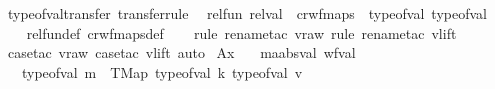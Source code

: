 \begin{isabellebody}
\isanewline
\isanewline
{}\isamarkupfalse%
\ type{\isacharunderscore}{\kern0pt}of{\isacharunderscore}{\kern0pt}val{\isacharunderscore}{\kern0pt}transfer\ {\isacharbrackleft}{\kern0pt}transfer{\isacharunderscore}{\kern0pt}rule{\isacharbrackright}{\kern0pt}{\isacharcolon}{\kern0pt}\isanewline
\ \ {\isachardoublequoteopen}rel{\isacharunderscore}{\kern0pt}fun\ {\isacharparenleft}{\kern0pt}rel{\isacharunderscore}{\kern0pt}val\ {\isacharparenleft}{\kern0pt}{\isacharequal}{\kern0pt}{\isacharparenright}{\kern0pt}\ cr{\isacharunderscore}{\kern0pt}wf{\isacharunderscore}{\kern0pt}maps{\isacharparenright}{\kern0pt}\ {\isacharparenleft}{\kern0pt}{\isacharequal}{\kern0pt}{\isacharparenright}{\kern0pt}\ type{\isacharunderscore}{\kern0pt}of{\isacharunderscore}{\kern0pt}val\ type{\isacharunderscore}{\kern0pt}of{\isacharunderscore}{\kern0pt}val{\isachardoublequoteclose}\isanewline
%
\isadelimproof
\ \ %
\endisadelimproof
%
\isatagproof
{}\isamarkupfalse%
\ rel{\isacharunderscore}{\kern0pt}fun{\isacharunderscore}{\kern0pt}def\ cr{\isacharunderscore}{\kern0pt}wf{\isacharunderscore}{\kern0pt}maps{\isacharunderscore}{\kern0pt}def\isanewline
\ \ \isamarkupfalse%
\ {\isacharparenleft}{\kern0pt}rule{\isacharcomma}{\kern0pt}\ rename{\isacharunderscore}{\kern0pt}tac\ v{\isacharunderscore}{\kern0pt}raw{\isacharcomma}{\kern0pt}\ rule{\isacharcomma}{\kern0pt}\ rename{\isacharunderscore}{\kern0pt}tac\ v{\isacharunderscore}{\kern0pt}lift{\isacharparenright}{\kern0pt}\isanewline
\ \ \isamarkupfalse%
\ {\isacharparenleft}{\kern0pt}case{\isacharunderscore}{\kern0pt}tac\ v{\isacharunderscore}{\kern0pt}raw{\isacharsemicolon}{\kern0pt}\ case{\isacharunderscore}{\kern0pt}tac\ v{\isacharunderscore}{\kern0pt}lift{\isacharsemicolon}{\kern0pt}\ auto{\isacharparenright}{\kern0pt}%
\endisatagproof
{\isafoldproof}%
%
\isadelimproof
\isanewline
%
\endisadelimproof
\isanewline
\isanewline
\isanewline
\isanewline
{}\isamarkupfalse%
\ Ax{}{\isacharcolon}{\kern0pt}\isanewline
\ \ \ m{\isacharcolon}{\kern0pt}{\isacharcolon}{\kern0pt}{\isachardoublequoteopen}{\isacharprime}{\kern0pt}a{\isacharcolon}{\kern0pt}{\isacharcolon}{\kern0pt}absval\ wf{\isacharunderscore}{\kern0pt}val{\isachardoublequoteclose}\isanewline
\ \ \ {\isachardoublequoteopen}type{\isacharunderscore}{\kern0pt}of{\isacharunderscore}{\kern0pt}val\ m\ {\isacharequal}{\kern0pt}\ TMap\ {\isacharparenleft}{\kern0pt}type{\isacharunderscore}{\kern0pt}of{\isacharunderscore}{\kern0pt}val\ k{\isacharparenright}{\kern0pt}\ {\isacharparenleft}{\kern0pt}type{\isacharunderscore}{\kern0pt}of{\isacharunderscore}{\kern0pt}val\ v{\isacharparenright}{\kern0pt}{\isachardoublequoteclose}\isanewline

\end{isabellebody}

